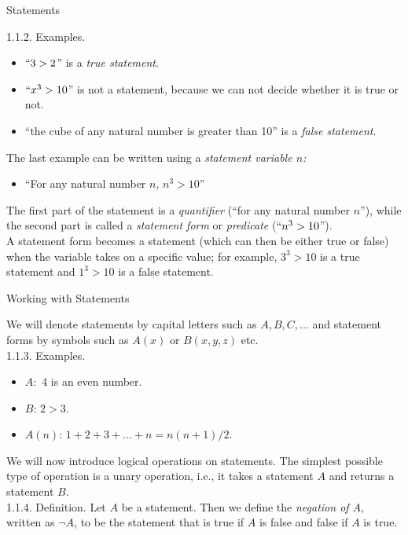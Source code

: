 \documentclass[smaller,hyperref={CJKbookmarks=true}]{beamer}
\begin{document}
\begin{frame}[t]{Statements}
\begin{spacing}{1.1}
\alert{1.1.2. Examples.}
\begin{itemize}
  \item $``3>2$'' is a \emph{true statement}.
  \item $``x^3>10$'' is not a statement, because we can not decide whether it is true or not.
  \item ``the cube of any natural number is greater than 10'' is a \emph{false statement}.
\end{itemize}
The last example can be written using a \emph{statement variable $n$:}
\begin{itemize}
  \item ``For any natural number $n,\,n^3>10$''
\end{itemize}
The first part of the statement is a \emph{quantifier} (``for any natural number $n$''), while the second part is called a \emph{statement form} or \emph{predicate} ($``n^3>10$'').\\[5pt]
A statement form becomes a statement (which can then be either true or
false) when the variable takes on a specific value; for example, $3^3>10$ is a true statement and $1^3>10$ is a false statement.
\end{spacing}
\end{frame}
\begin{frame}[c]{Working with Statements}
\begin{spacing}{1.2}
We will denote statements by capital letters such as $A,B,C,...$ and statement forms by symbols such as $A(x)$ or $B(x,y,z)$ etc.\\[5pt]
\alert{1.1.3. Examples.}
\begin{itemize}
  \item $A\!:$ 4 is an even number.
  \item $B\!:\,2>3$.
  \item $A(n)\!:\,1+2+3+...+n=n(n+1)/2$.
\end{itemize}
We will now introduce logical operations on statements. The simplest
possible type of operation is a unary operation, i.e., it takes a statement $A$
and returns a statement $B$.\\[4pt]
\alert{1.1.4. Definition.} Let $A$ be a statement. Then we define the \emph{negation of $A$}, written as $\neg A$, to be the statement that is true if $A$ is false and false if $A$ is true.
\end{spacing}
\end{frame}
\end{document}
